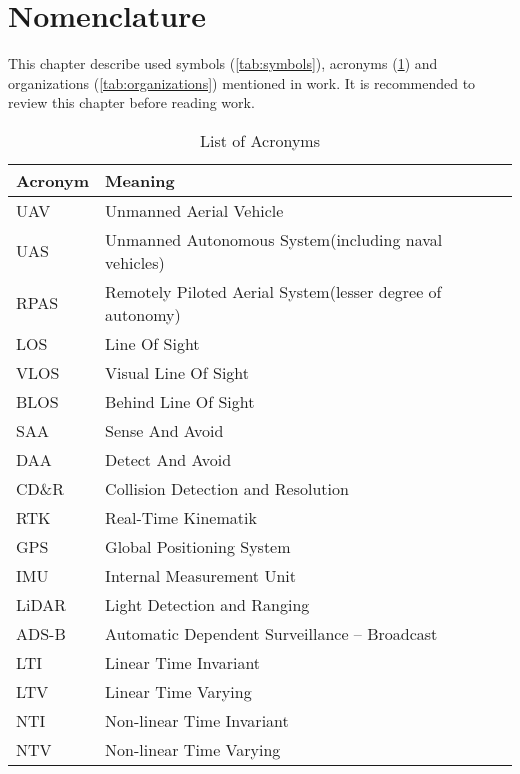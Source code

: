 \chapter*{Nomenclature}
\noindent
This chapter describe used symbols (\ref{tab:symbols}), acronyms (\ref{tab:acronym}) and organizations (\ref{tab:organizations}) mentioned in work. It is recommended to review this chapter before reading work.
\begin{table}[H]
    \centering
    \begin{tabularx}{\textwidth}{|l||X|}
    \hline
    Acronym & Meaning\\ \hline\hline
    UAV & Unmanned Aerial Vehicle\\ \hline
    UAS & Unmanned Autonomous System(including naval vehicles)\\ \hline
    RPAS & Remotely Piloted Aerial System(lesser degree of autonomy)\\ \hline
    LOS & Line Of Sight\\ \hline
    VLOS & Visual Line Of Sight\\ \hline
    BLOS & Behind Line Of Sight\\ \hline
    SAA & Sense And Avoid\\ \hline
    DAA & Detect And Avoid \\ \hline
    CD\&R & Collision Detection and Resolution\\ \hline
    RTK & Real-Time Kinematik\\ \hline
    GPS & Global Positioning System\\ \hline
    IMU & Internal Measurement Unit\\ \hline
    LiDAR &  Light Detection and Ranging \\ \hline
    ADS-B & Automatic Dependent Surveillance – Broadcast\\ \hline
    LTI & Linear Time Invariant\\ \hline
    LTV & Linear Time Varying\\ \hline
    NTI & Non-linear Time Invariant\\ \hline
    NTV & Non-linear Time Varying\\ \hline
    \end{tabularx}
    \caption{List of Acronyms}
    \label{tab:acronym}
\end{table}

